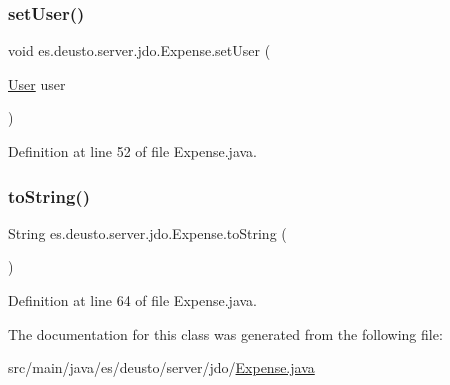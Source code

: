 \subsubsection{\texorpdfstring{set\+User()}{setUser()}}
{\footnotesize\ttfamily void es.\+deusto.\+server.\+jdo.\+Expense.\+set\+User (\begin{DoxyParamCaption}\item[{\hyperlink{classes_1_1deusto_1_1server_1_1jdo_1_1_user}{User}}]{user }\end{DoxyParamCaption})}



Definition at line 52 of file Expense.\+java.

\mbox{\label{classes_1_1deusto_1_1server_1_1jdo_1_1_expense_a0f197f3e223803cab5fba71cc481af31}} 
\subsubsection{\texorpdfstring{to\+String()}{toString()}}
{\footnotesize\ttfamily String es.\+deusto.\+server.\+jdo.\+Expense.\+to\+String (\begin{DoxyParamCaption}{ }\end{DoxyParamCaption})}



Definition at line 64 of file Expense.\+java.



The documentation for this class was generated from the following file\+:\begin{DoxyCompactItemize}
\item 
src/main/java/es/deusto/server/jdo/\hyperlink{_expense_8java}{Expense.\+java}\end{DoxyCompactItemize}
